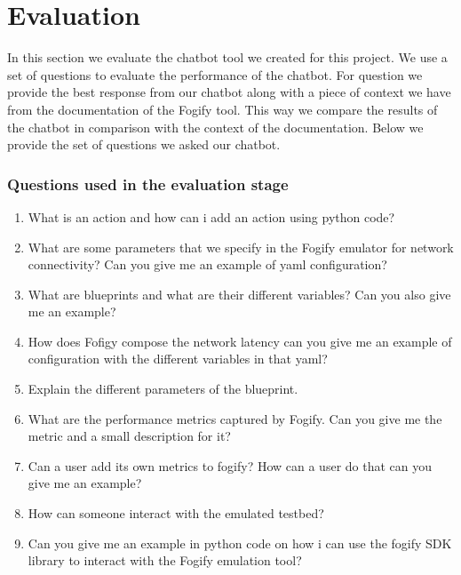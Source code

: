 \section{Evaluation}
\label{sec:evaluation}
In this section we evaluate the chatbot tool we created for this project. We
use a set of questions to evaluate the performance of the chatbot. For question
we provide the best response from our chatbot along with a piece of context we
have from the documentation of the Fogify tool. This way we compare the results
of the chatbot in comparison with the context of the documentation. Below we
provide the set of questions we asked our chatbot.

\subsubsection*{Questions used in the evaluation stage}
\begin{enumerate}
    \item What is an action and how can i add an action using python code?
    \item What are some parameters that we specify in the Fogify emulator for
          network connectivity? Can you give me an example of yaml
          configuration?
    \item What are blueprints and what are their different variables? Can you
          also give me an example?
    \item How does Fofigy compose the network latency can you give me an
          example of configuration with the different variables in that yaml?
    \item Explain the different parameters of the blueprint.
    \item What are the performance metrics captured by Fogify. Can you give me
          the metric and a small description for it?
    \item Can a user add its own metrics to fogify? How can a user do that can
          you give me an example?
    \item How can someone interact with the emulated testbed?
    \item Can you give me an example in python code on how i can use the fogify
          SDK library to interact with the Fogify emulation tool?
\end{enumerate}

